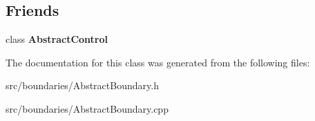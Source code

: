 \subsection*{Friends}
\begin{DoxyCompactItemize}
\item 
\mbox{\label{class_abstract_boundary_a53e200cea9e8515d1a76f980bcfd500d}} 
class {\bfseries Abstract\+Control}
\end{DoxyCompactItemize}


The documentation for this class was generated from the following files\+:\begin{DoxyCompactItemize}
\item 
src/boundaries/Abstract\+Boundary.\+h\item 
src/boundaries/Abstract\+Boundary.\+cpp\end{DoxyCompactItemize}
